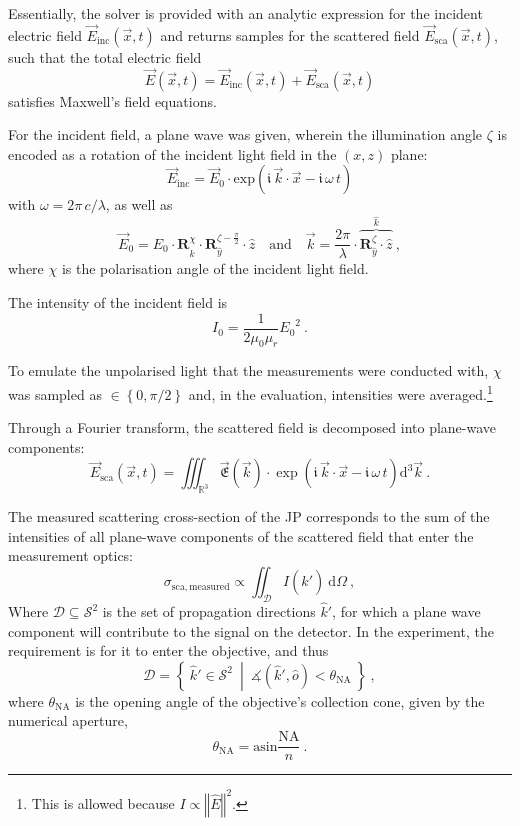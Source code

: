 \documentclass[10pt]{article}
\begin{document}
\begin{multicols}{2}
Essentially, the solver is provided with an analytic expression for the incident electric field
$\vec{E}_\mathrm{inc}(\vec{x},t)$
and returns samples for the scattered field
$\vec{E}_\mathrm{sca}(\vec{x},t)$, 
such that the total electric field 
$$\vec{E}(\vec{x},t) = \vec{E}_\mathrm{inc}(\vec{x},t) + \vec{E}_\mathrm{sca}(\vec{x},t) $$
satisfies Maxwell's field equations. 

For the incident field, a plane wave was given, wherein the illumination angle $\zeta$ is encoded as a rotation of the incident light field in the $(x,z)$ plane: 
$$
    \vec{E}_\mathrm{inc} = \vec{E}_0 \cdot \mathrm{exp}\left( \mathfrak{i} \, \vec{k} \cdot \vec{x} - \mathfrak{i} \, \omega \, t \right)
$$
with $\omega = 2\pi\,c/\lambda$, as well as
$$
    \vec{E}_0 = E_0 \cdot \boldsymbol{R}_{\hat{k}}^{\chi} \cdot \boldsymbol{R}_{\hat{y}}^{\zeta-\frac{\pi}{2}} \cdot \hat{z}
    \quad\text{and}\quad
    \vec{k} = \frac{2\pi}{\lambda} \cdot \overbrace{ \boldsymbol{R}_{\hat{y}}^{\zeta} \cdot \hat{z} }^{\hat{k}}
    \ ,
$$
where $\chi$ is the polarisation angle of the incident light field. %

The intensity of the incident field is 
$$I_0 = \frac{1}{2\mu_0 \mu_r} {E_0}^2 \ .$$
\cite{Griffiths-ED,MA}



To emulate the unpolarised light that the measurements were conducted with, $\chi$ was sampled as \mbox{$\in\left\lbrace0, \pi/2\right\rbrace$} and, in the evaluation, intensities were averaged.\footnote{This is allowed because $I\propto\left\Vert \hat{E} \right\Vert^2$.}

Through a Fourier transform, the scattered field is decomposed into plane-wave components:
$$
    \vec{E}_\mathrm{sca}(\vec{x},t) = \iiint_{\mathds{R}^3} \vec{\mathfrak{E}}(\vec{k}) \cdot \exp\!\left( \mathfrak{i}\,\vec{k}\cdot\vec{x} - \mathfrak{i}\,\omega\,t\right) \mathrm{d}^3 \vec{k} \ .
$$


The measured scattering cross-section of the JP corresponds to the sum of the intensities of all plane-wave components of the scattered field that enter the measurement optics:
$$\sigma_\mathrm{sca,measured} \propto \iint_{\mathcal{D}} I\left( \hat{k}' \right) ~\mathrm{d}\Omega\ ,$$
Where $\mathcal{D} \subseteq \mathcal{S}^2$ is the set of propagation directions $\hat{k}'$, for which a plane wave component will contribute to the signal on the detector. 
In the experiment, the requirement is for it to enter the objective, and thus
$$
    \mathcal{D} = \left\lbrace\ \hat{k}' \in \mathcal{S}^2\ \middle\vert\ \measuredangle\!\left( \hat{k}', \hat{o}\right) < \theta_\mathrm{NA}\ \right\rbrace
    \ ,
$$
where $\theta_\mathrm{NA}$ is the opening angle of the objective's collection cone, given by the numerical aperture,
$$\theta_\mathrm{NA} = \mathrm{asin}\frac{\mathrm{NA}}{n} \ .$$


\end{multicols}
\end{document}
